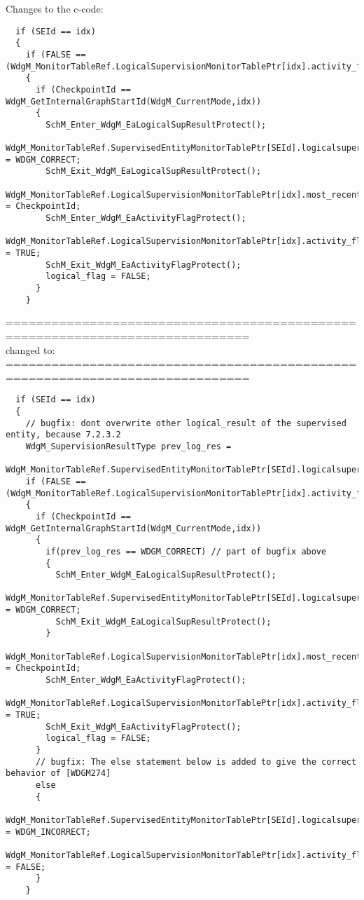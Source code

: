 \documentclass[11pt,a4paper]{article}
\begin{document}
Changes to the c-code:
\begin{lstlisting}
  if (SEId == idx)
  {
    if (FALSE == (WdgM_MonitorTableRef.LogicalSupervisionMonitorTablePtr[idx].activity_flag))
    {
      if (CheckpointId == WdgM_GetInternalGraphStartId(WdgM_CurrentMode,idx))
      {
        SchM_Enter_WdgM_EaLogicalSupResultProtect();
        WdgM_MonitorTableRef.SupervisedEntityMonitorTablePtr[SEId].logicalsupervision_result = WDGM_CORRECT;
        SchM_Exit_WdgM_EaLogicalSupResultProtect();
        WdgM_MonitorTableRef.LogicalSupervisionMonitorTablePtr[idx].most_recently_reported = CheckpointId;
        SchM_Enter_WdgM_EaActivityFlagProtect();
        WdgM_MonitorTableRef.LogicalSupervisionMonitorTablePtr[idx].activity_flag = TRUE;
        SchM_Exit_WdgM_EaActivityFlagProtect();
        logical_flag = FALSE;
      }
    }
\end{lstlisting}
==============================================================================\\
changed to:\\
==============================================================================
\begin{lstlisting}
  if (SEId == idx)
  {
    // bugfix: dont overwrite other logical_result of the supervised entity, because 7.2.3.2
    WdgM_SupervisionResultType prev_log_res =
      WdgM_MonitorTableRef.SupervisedEntityMonitorTablePtr[SEId].logicalsupervision_result;
    if (FALSE == (WdgM_MonitorTableRef.LogicalSupervisionMonitorTablePtr[idx].activity_flag))
    {
      if (CheckpointId == WdgM_GetInternalGraphStartId(WdgM_CurrentMode,idx))
      {
        if(prev_log_res == WDGM_CORRECT) // part of bugfix above
        {
          SchM_Enter_WdgM_EaLogicalSupResultProtect();
          WdgM_MonitorTableRef.SupervisedEntityMonitorTablePtr[SEId].logicalsupervision_result = WDGM_CORRECT;
          SchM_Exit_WdgM_EaLogicalSupResultProtect();
        }
        WdgM_MonitorTableRef.LogicalSupervisionMonitorTablePtr[idx].most_recently_reported = CheckpointId;
        SchM_Enter_WdgM_EaActivityFlagProtect();
        WdgM_MonitorTableRef.LogicalSupervisionMonitorTablePtr[idx].activity_flag = TRUE;
        SchM_Exit_WdgM_EaActivityFlagProtect();
        logical_flag = FALSE;
      }
      // bugfix: The else statement below is added to give the correct behavior of [WDGM274]
      else
      {
        WdgM_MonitorTableRef.SupervisedEntityMonitorTablePtr[SEId].logicalsupervision_result = WDGM_INCORRECT;
        WdgM_MonitorTableRef.LogicalSupervisionMonitorTablePtr[idx].activity_flag = FALSE;
      }
    }
\end{lstlisting}
\newpage
\end{document}
